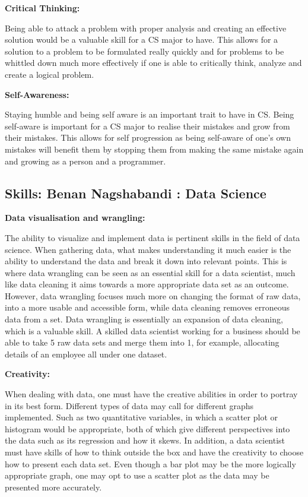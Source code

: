 \documentclass[a4paper, 11pt]{report}
\begin{document}
\bigskip

\textbf{Critical Thinking:}
\par Being able to attack a problem with proper analysis and creating an effective solution would be a valuable skill for a CS major to have. This allows for a solution to a problem to be formulated really quickly and for problems to be whittled down much more effectively if one is able to critically think, analyze and create a logical problem. 

\bigskip

\textbf{Self-Awareness:}
\par Staying humble and being self aware is an important trait to have in CS. Being self-aware is important for a CS major to realise their mistakes and grow from their mistakes. This allows for self progression as being self-aware of one's own mistakes will benefit them by stopping them from making the same mistake again and growing as a person and a programmer. 

\subsection{Skills: Benan Nagshabandi : Data Science}

\indent\indent\textbf{Data visualisation and wrangling:}
\par The ability to visualize and implement data is pertinent skills in the field of data science. When gathering data, what makes understanding it much easier is the ability to understand the data and break it down into relevant points. This is where data wrangling can be seen as an essential skill for a data scientist, much like data cleaning it aims towards a more appropriate data set as an outcome. However,  data wrangling focuses much more on changing the format of raw data, into a more usable and accessible form, while data cleaning removes erroneous data from a set. Data wrangling is essentially an expansion of data cleaning, which is a valuable skill. A skilled data scientist working for a business should be able to take 5 raw data sets and merge them into 1, for example, allocating details of an employee all under one dataset.

\bigskip

\textbf{Creativity:}
\par When dealing with data, one must have the creative abilities in order to portray in its best form. Different types of data may call for different graphs implemented. Such as two quantitative variables, in which a scatter plot or histogram would be appropriate, both of which give different perspectives into the data such as its regression and how it skews. In addition, a data scientist must have skills of how to think outside the box and have the creativity to choose how to present each data set. Even though a bar plot may be the more logically appropriate graph, one may opt to use a scatter plot as the data may be presented more accurately.
\end{document}
